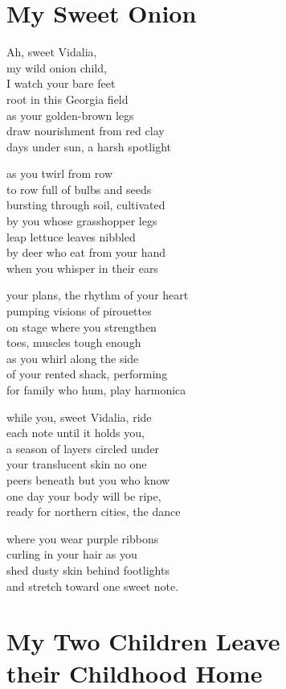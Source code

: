 \documentclass[twoside,10pt]{book}
\begin{document}
\clearpage
\section{My Sweet Onion}

Ah, sweet Vidalia,\\
my wild onion child,\\
I watch your bare feet\\
root in this Georgia field\\
as your golden-brown legs\\
draw nourishment from red clay\\
days under sun, a harsh spotlight

as you twirl from row\\
to row full of bulbs and seeds\\
bursting through soil, cultivated\\
by you whose grasshopper legs\\
leap lettuce leaves nibbled\\
by deer who eat from your hand\\
when you whisper in their ears

your plans, the rhythm of your heart\\
pumping visions of pirouettes\\
on stage where you strengthen\\
toes, muscles tough enough\\
as you whirl along the side\\
of your rented shack, performing\\
for family who hum, play harmonica

while you, sweet Vidalia, ride\\
each note until it holds you,\\
a season of layers circled under\\
your translucent skin no one\\
peers beneath but you who know\\
one day your body will be ripe,\\
ready for northern cities, the dance

where you wear purple ribbons\\
curling in your hair as you\\
shed dusty skin behind footlights\\
and stretch toward one sweet note.


\clearpage
\section{My Two Children Leave
  \\ their Childhood Home}
\end{document}
